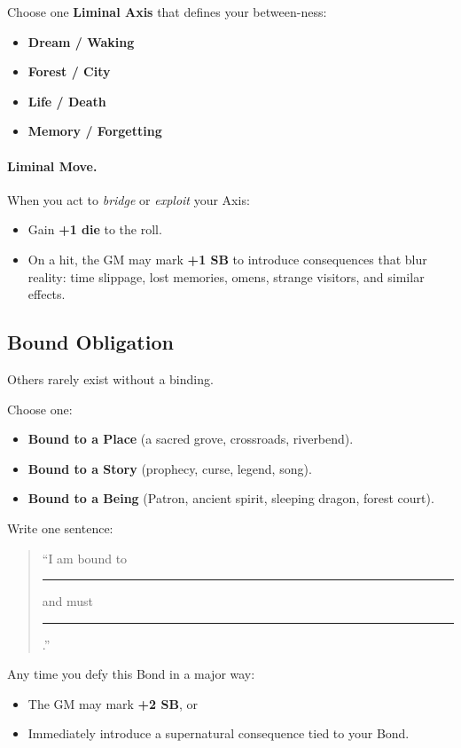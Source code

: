 \documentclass[11pt]{book}
\begin{document}
Choose one \textbf{Liminal Axis} that defines your between-ness:
\begin{itemize}
  \item \textbf{Dream / Waking}
  \item \textbf{Forest / City}
  \item \textbf{Life / Death}
  \item \textbf{Memory / Forgetting}
\end{itemize}

\paragraph{Liminal Move.}
When you act to \emph{bridge} or \emph{exploit} your Axis:
\begin{itemize}
  \item Gain \textbf{+1 die} to the roll.
  \item On a hit, the GM may mark \textbf{+1 SB} to introduce consequences that blur reality: time slippage, lost memories, omens, strange visitors, and similar effects.
\end{itemize}

\subsection{Bound Obligation}
\label{subsec:bound_obligation}

Others rarely exist without a binding.

Choose one:
\begin{itemize}
  \item \textbf{Bound to a \textbf{Place}} (a sacred grove, crossroads, riverbend).
  \item \textbf{Bound to a \textbf{Story}} (prophecy, curse, legend, song).
  \item \textbf{Bound to a \textbf{Being}} (Patron, ancient spirit, sleeping dragon, forest court).
\end{itemize}

Write one sentence:
\begin{quote}
  ``I am bound to \rule{2cm}{0.15mm} and must \rule{2cm}{0.15mm}.'' 
\end{quote}

Any time you defy this Bond in a major way:
\begin{itemize}
  \item The GM may mark \textbf{+2 SB}, or
  \item Immediately introduce a supernatural consequence tied to your Bond.
\end{itemize}
\end{document}
